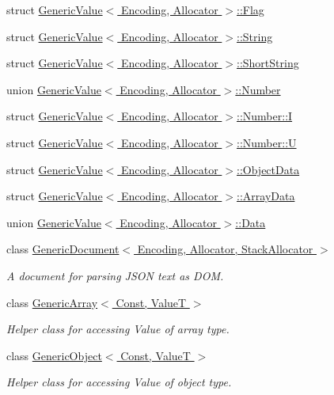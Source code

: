 \begin{DoxyCompactItemize}
struct \hyperlink{a02084}{Generic\+Value$<$ Encoding, Allocator $>$\+::\+Flag}
\item 
struct \hyperlink{a02088}{Generic\+Value$<$ Encoding, Allocator $>$\+::\+String}
\item 
struct \hyperlink{a02092}{Generic\+Value$<$ Encoding, Allocator $>$\+::\+Short\+String}
\item 
union \hyperlink{a02096}{Generic\+Value$<$ Encoding, Allocator $>$\+::\+Number}
\item 
struct \hyperlink{a02100}{Generic\+Value$<$ Encoding, Allocator $>$\+::\+Number\+::I}
\item 
struct \hyperlink{a02104}{Generic\+Value$<$ Encoding, Allocator $>$\+::\+Number\+::U}
\item 
struct \hyperlink{a02108}{Generic\+Value$<$ Encoding, Allocator $>$\+::\+Object\+Data}
\item 
struct \hyperlink{a02112}{Generic\+Value$<$ Encoding, Allocator $>$\+::\+Array\+Data}
\item 
union \hyperlink{a02116}{Generic\+Value$<$ Encoding, Allocator $>$\+::\+Data}
\item 
class \hyperlink{a01996}{Generic\+Document$<$ Encoding, Allocator, Stack\+Allocator $>$}
\begin{DoxyCompactList}\small\item\em A document for parsing J\+S\+ON text as D\+OM. \end{DoxyCompactList}\item 
class \hyperlink{a02076}{Generic\+Array$<$ Const, Value\+T $>$}
\begin{DoxyCompactList}\small\item\em Helper class for accessing Value of array type. \end{DoxyCompactList}\item 
class \hyperlink{a02080}{Generic\+Object$<$ Const, Value\+T $>$}
\begin{DoxyCompactList}\small\item\em Helper class for accessing Value of object type. \end{DoxyCompactList}\end{DoxyCompactItemize}
